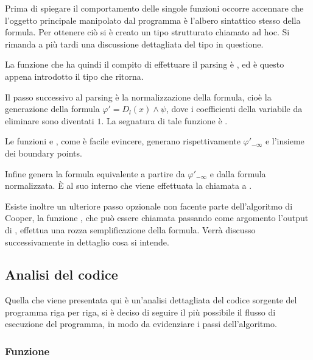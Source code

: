 \documentclass[11pt,letterpaper,twoside]{article}
\begin{document}
Prima di spiegare il comportamento delle singole funzioni occorre accennare che
l'oggetto principale manipolato dal programma è l'albero sintattico stesso della
formula. Per ottenere ciò si è creato un tipo strutturato chiamato
 ad hoc. Si rimanda a più tardi una discussione dettagliata
del tipo in questione.

La funzione che ha quindi il compito di effettuare il parsing è
, ed è questo appena introdotto il tipo
che ritorna.

Il passo successivo al parsing è la normalizzazione della formula, cioè la
generazione della formula $\varphi' = D_l(x) \land \psi$, dove i coefficienti
della variabile da eliminare sono diventati $1$. La segnatura di tale funzione è
.

Le funzioni  e
\newline {},
come è facile evincere, generano rispettivamente $\varphi' _{- \infty}$ e
l'insieme dei boundary points.

Infine  genera la formula equivalente a partire da $\varphi '_{- \infty}$ e
dalla formula normalizzata. \`E al suo interno che viene effettuata la chiamata
a .

Esiste inoltre un ulteriore passo opzionale non facente parte dell'algoritmo di
Cooper, la funzione , che può essere
chiamata passando come argomento l'output di , effettua una
rozza semplificazione della formula. Verrà discusso successivamente in dettaglio
cosa si intende.

\subsection{Analisi del codice} Quella che viene presentata qui è un'analisi
dettagliata del codice sorgente del programma riga per riga, si è deciso di
seguire il più possibile il flusso di esecuzione del programma, in modo da
evidenziare i passi dell'algoritmo.

\subsubsection{Funzione } 
\end{document}

